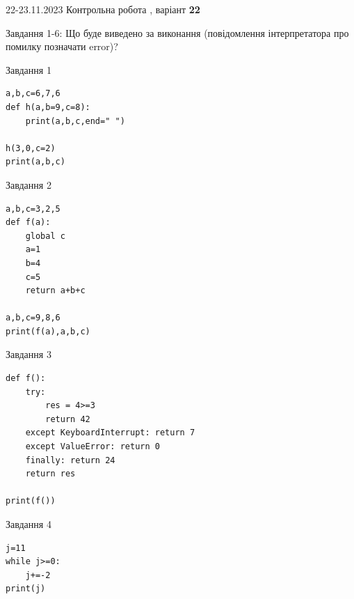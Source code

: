 \documentclass[12pt, ukrainian]{article}
\begin{document}
{{22-23.11.2023 Контрольна робота , варіант  \No \textbf { 22 }\par}}
{

Завдання 1-6: Що буде виведено за виконання (повідомлення інтерпретатора про помилку позначати error)?


\begin{minipage}[t]{9.7cm}                
{\begin{center}Завдання {1}\end{center}}
\begin{verbatim}
a,b,c=6,7,6
def h(a,b=9,c=8):
    print(a,b,c,end=" ")

h(3,0,c=2)
print(a,b,c)
\end{verbatim}     
\end{minipage}
\vline \hspace{8mm}
\begin{minipage}[t]{8.0cm}                
{\begin{center}Завдання {2}\end{center}}
\begin{verbatim}
a,b,c=3,2,5
def f(a):
    global c
    a=1
    b=4
    c=5
    return a+b+c

a,b,c=9,8,6
print(f(a),a,b,c)
\end{verbatim}     
\end{minipage}

\vspace{15mm}
\begin{minipage}[t]{9.7cm}                
{\begin{center}Завдання {3}\end{center}}
\begin{verbatim}
def f():
    try:
        res = 4>=3
        return 42
    except KeyboardInterrupt: return 7
    except ValueError: return 0
    finally: return 24
    return res

print(f())
\end{verbatim}     
\end{minipage}
\vline \hspace{8mm}
\begin{minipage}[t]{8.0cm}                
{\begin{center}Завдання {4}\end{center}}
\begin{verbatim}
j=11
while j>=0:
    j+=-2
print(j)
\end{verbatim}     
\end{minipage}

}
\end{document}
